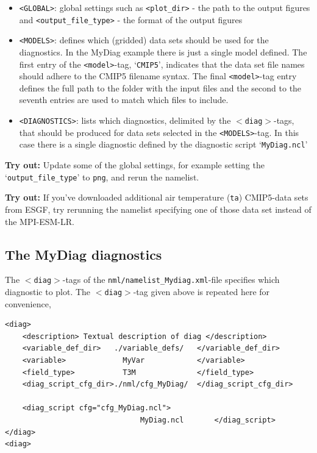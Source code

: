 \documentclass[12pt]{article}
\newcommand{\xmltag}[1]{\texttt{$<$#1$>$}}
\begin{document}
\begin{itemize}
\item{\texttt{<GLOBAL>}:} global settings such as \texttt{<plot\_dir>}
- the path to the output figures and \texttt{<output\_file\_type>} - 
the format of the output figures

\item{\texttt{<MODELS>}:} defines which (gridded) data sets should be
used for the diagnostics. In the MyDiag example there is just a single
model defined. The first entry of the \texttt{<model>}-tag,
`\texttt{CMIP5}', indicates that the data set file names should adhere
to the CMIP5 filename syntax\cite{pcmdi-cmip5}. The final
\texttt{<model>}-tag entry defines the full path to the folder with
the input files and the second to the seventh entries are used to
match which files to include.

\item{\texttt{<DIAGNOSTICS>}:} lists which diagnostics, delimited by
the \xmltag{diag}-tags, that should be produced for data sets selected
in the \texttt{<MODELS>}-tag. In this case there is a single
diagnostic defined by the diagnostic script `\texttt{MyDiag.ncl}'
\end{itemize}

\textbf{Try out:} Update some of the global settings, for example
setting the `\texttt{output\_file\_type}' to \texttt{png}, and rerun
the namelist. 

\textbf{Try out:} If you've downloaded additional air temperature
(\texttt{ta}) CMIP5-data sets from ESGF\cite{esgf}, try rerunning
the namelist specifying one of those data set instead of the
MPI-ESM-LR.

\subsection{The MyDiag diagnostics}\label{subsection:mydiag_diagtag}
The \xmltag{diag}-tags of the \texttt{nml/namelist\_Mydiag.xml}-file
specifies which diagnostic to plot. The \xmltag{diag}-tag given above
is repeated here for convenience,
\begin{Verbatim}[frame=single, fontsize=\footnotesize]
<diag>
    <description> Textual description of diag </description>
    <variable_def_dir>   ./variable_defs/   </variable_def_dir>
    <variable>             MyVar            </variable>
    <field_type>           T3M              </field_type>
    <diag_script_cfg_dir>./nml/cfg_MyDiag/  </diag_script_cfg_dir>

    <diag_script cfg="cfg_MyDiag.ncl"> 
                               MyDiag.ncl       </diag_script>
</diag>
<diag>
\end{Verbatim}
\end{document}
